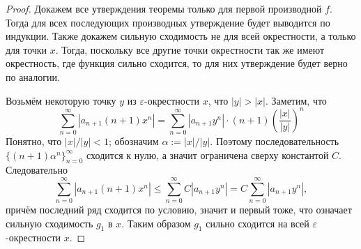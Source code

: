 \documentclass[12pt,a4paper]{article}
\begin{document}
    \begin{proof}
        Докажем все утверждения теоремы только для первой производной $f$. Тогда для всех последующих производных утверждение будет выводится по индукции. Также докажем сильную сходимость не для всей окрестности, а только для точки $x$. Тогда, поскольку все другие точки окрестности так же имеют окрестность, где функция сильно сходится, то для них утверждение будет верно по аналогии.

        Возьмём некоторую точку $y$ из $\varepsilon$-окрестности $x$, что $|y| > |x|$. Заметим, что
        \[\sum_{n=0}^\infty |a_{n+1} (n+1) x^n| = \sum_{n=0}^\infty |a_{n+1} y^n| \cdot (n+1) \left(\frac{|x|}{|y|}\right)^n\]
        Понятно, что $|x|/|y| < 1$; обозначим $\alpha := |x|/|y|$. Поэтому последовательность $\{(n+1)\alpha^n\}_{n=0}^\infty$ сходится к нулю, а значит ограничена сверху константой $C$. Следовательно
        \[\sum_{n=0}^\infty |a_{n+1} (n+1) x^n| \leqslant \sum_{n=0}^\infty C|a_{n+1} y^n| = C \sum_{n=0}^\infty |a_{n+1} y^n|,\]
        причём последний ряд сходится по условию, значит и первый тоже, что означает сильную сходимость $g_1$ в $x$. Таким образом $g_1$ сильно сходится на всей $\varepsilon$-окрестности $x$.


\end{proof}
\end{document}

